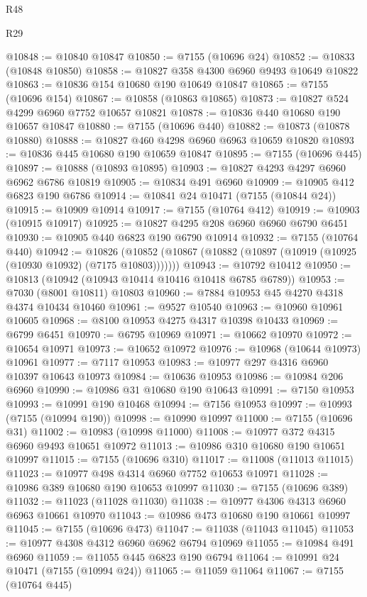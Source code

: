 \begin{lexlean}{R48}
\begin{lexlean}{R29}
\begin{coremodule}
{{{{{{{{{{{{{{{{{{{{{{{{{{{{{{{{{{{{{{{{{{{{{{{{{{{{{{{{{{{{{{{{{{{{{{{{{{{{{{{{{{{{{{{{{{{{{{{{{{{{{{{{{{{{{{{{{{{{{{{{{{{{{{{{{{{{{{{{{{{{{{{{{{{{{{{{{{{{{{{{{{{{{{{{{{{{{{{{{{{{{{{{{{{{{{{{{{{{{{{{{{{{{{{{{{{{{{{{{{@10848 := @10840 @10847
@10850 := @7155 (@10696 @24)
@10852 := @10833 (@10848 @10850)
@10858 := @10827 @358 @4300 @6960 @9493 @10649 @10822
@10863 := @10836 @154 @10680 @190 @10649 @10847
@10865 := @7155 (@10696 @154)
@10867 := @10858 (@10863 @10865)
@10873 := @10827 @524 @4299 @6960 @7752 @10657 @10821
@10878 := @10836 @440 @10680 @190 @10657 @10847
@10880 := @7155 (@10696 @440)
@10882 := @10873 (@10878 @10880)
@10888 := @10827 @460 @4298 @6960 @6963 @10659 @10820
@10893 := @10836 @445 @10680 @190 @10659 @10847
@10895 := @7155 (@10696 @445)
@10897 := @10888 (@10893 @10895)
@10903 := @10827 @4293 @4297 @6960 @6962 @6786 @10819
@10905 := @10834 @491 @6960
@10909 := @10905 @412 @6823 @190 @6786
@10914 := @10841 @24 @10471 (@7155 (@10844 @24))
@10915 := @10909 @10914
@10917 := @7155 (@10764 @412)
@10919 := @10903 (@10915 @10917)
@10925 := @10827 @4295 @208 @6960 @6960 @6790 @6451
@10930 := @10905 @440 @6823 @190 @6790 @10914
@10932 := @7155 (@10764 @440)
@10942 := @10826
    (@10852 (@10867 (@10882 (@10897 (@10919 (@10925 (@10930 @10932) (@7175 @10803)))))))
@10943 := @10792 @10412
@10950 := @10813 (@10942 (@10943 @10414 @10416 @10418 @6785 @6789))
@10953 := @7030 (@8001 @10811) @10803
@10960 := @7884 @10953 @45 @4270 @4318 @4374 @10434 @10460
@10961 := @9527 @10540
@10963 := @10960 @10961 @10605
@10968 := @8100 @10953 @4275 @4317 @10398 @10433
@10969 := @6799 @6451
@10970 := @6795 @10969
@10971 := @10662 @10970
@10972 := @10654 @10971
@10973 := @10652 @10972
@10976 := @10968 (@10644 @10973) @10961
@10977 := @7117 @10953
@10983 := @10977 @297 @4316 @6960 @10397 @10643 @10973
@10984 := @10636 @10953
@10986 := @10984 @206 @6960
@10990 := @10986 @31 @10680 @190 @10643
@10991 := @7150 @10953
@10993 := @10991 @190 @10468
@10994 := @7156 @10953
@10997 := @10993 (@7155 (@10994 @190))
@10998 := @10990 @10997
@11000 := @7155 (@10696 @31)
@11002 := @10983 (@10998 @11000)
@11008 := @10977 @372 @4315 @6960 @9493 @10651 @10972
@11013 := @10986 @310 @10680 @190 @10651 @10997
@11015 := @7155 (@10696 @310)
@11017 := @11008 (@11013 @11015)
@11023 := @10977 @498 @4314 @6960 @7752 @10653 @10971
@11028 := @10986 @389 @10680 @190 @10653 @10997
@11030 := @7155 (@10696 @389)
@11032 := @11023 (@11028 @11030)
@11038 := @10977 @4306 @4313 @6960 @6963 @10661 @10970
@11043 := @10986 @473 @10680 @190 @10661 @10997
@11045 := @7155 (@10696 @473)
@11047 := @11038 (@11043 @11045)
@11053 := @10977 @4308 @4312 @6960 @6962 @6794 @10969
@11055 := @10984 @491 @6960
@11059 := @11055 @445 @6823 @190 @6794
@11064 := @10991 @24 @10471 (@7155 (@10994 @24))
@11065 := @11059 @11064
@11067 := @7155 (@10764 @445)
}}}}}}}}}}}}}}}}}}}}}}}}}}}}}}}}}}}}}}}}}}}}}}}}}}}}}}}}}}}}}}}}}}}}}}}}}}}}}}}}}}}}}}}}}}}}}}}}}}}}}}}}}}}}}}}}}}}}}}}}}}}}}}}}}}}}}}}}}}}}}}}}}}}}}}}}}}}}}}}}}}}}}}}}}}}}}}}}}}}}}}}}}}}}}}}}}}}}}}}}}}}}}}}}}}}}}}}}}}
\end{coremodule}
\end{lexlean}
\end{lexlean}
